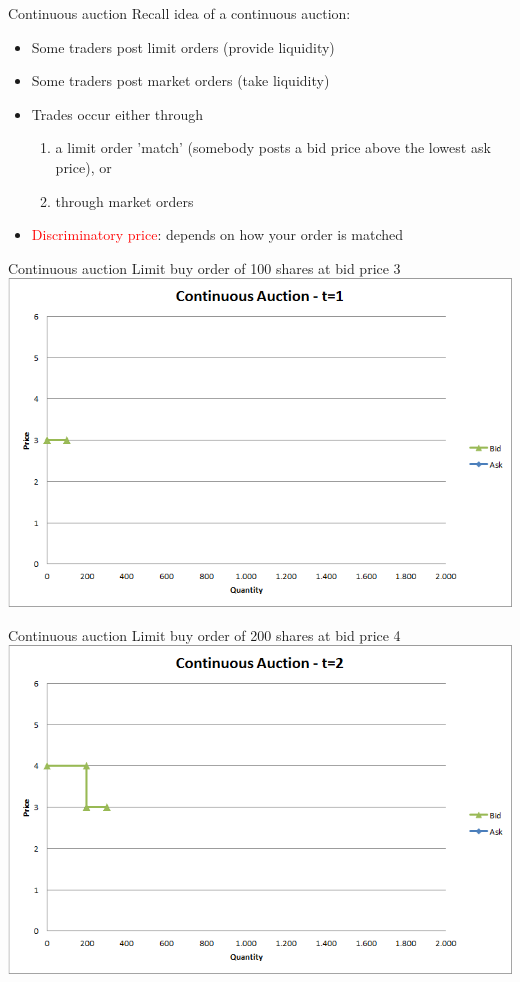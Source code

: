 \documentclass[english,10pt]{beamer}
\theoremstyle{definition}
\begin{document}
\begin{frame}{Continuous auction}
	Recall idea of a continuous auction:
	\begin{itemize}
		\item Some traders post limit orders (provide liquidity)
		\item Some traders post market orders (take liquidity)
		\item Trades occur either through 
		\begin{enumerate}
			\item a limit order 'match' (somebody posts a bid price above the lowest ask price), or
			\item through market orders
		\end{enumerate}
		\item \textcolor{red}{Discriminatory price}: depends on how your order is matched
	\end{itemize}
\end{frame}


\begin{frame}{Continuous auction}
	Limit buy order of 100 shares at bid price 3
	\quad
	\center
	\includegraphics[width=.75\linewidth]{pics/Continuous_t1}
\end{frame}


\begin{frame}{Continuous auction}
	Limit buy order of 200 shares at bid price 4
	\quad
	\center
	\includegraphics[width=.75\linewidth]{pics/Continuous_t2}
\end{frame}
\end{document}
